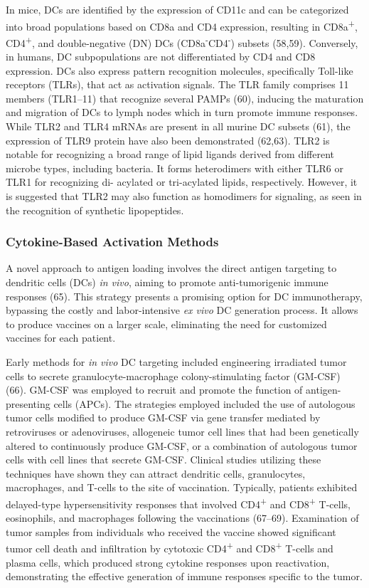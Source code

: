 \documentclass[
]{article}
\begin{document}
In mice, DCs are identified by the expression of CD11c and can be
categorized into broad populations based on CD8a and CD4 expression,
resulting in CD8a\textsuperscript{+}, CD4\textsuperscript{+}, and
double-negative (DN) DCs (CD8a\textsuperscript{-}CD4\textsuperscript{-})
subsets (58,59). Conversely, in humans, DC subpopulations are not
differentiated by CD4 and CD8 expression. DCs also express pattern
recognition molecules, specifically Toll-like receptors (TLRs), that act
as activation signals. The TLR family comprises 11 members (TLR1--11)
that recognize several PAMPs (60), inducing the maturation and migration
of DCs to lymph nodes which in turn promote immune responses. While TLR2
and TLR4 mRNAs are present in all murine DC subsets (61), the expression
of TLR9 protein have also been demonstrated (62,63). TLR2 is notable for
recognizing a broad range of lipid ligands derived from different
microbe types, including bacteria. It forms heterodimers with either
TLR6 or TLR1 for recognizing di- acylated or tri-acylated lipids,
respectively. However, it is suggested that TLR2 may also function as
homodimers for signaling, as seen in the recognition of synthetic
lipopeptides.

\subsubsection{Cytokine-Based Activation
Methods}\label{cytokine-based-activation-methods}

A novel approach to antigen loading involves the direct antigen
targeting to dendritic cells (DCs) \emph{in vivo}, aiming to promote
anti-tumorigenic immune responses (65). This strategy presents a
promising option for DC immunotherapy, bypassing the costly and
labor-intensive \emph{ex vivo} DC generation process. It allows to
produce vaccines on a larger scale, eliminating the need for customized
vaccines for each patient.

Early methods for \emph{in vivo} DC targeting included engineering
irradiated tumor cells to secrete granulocyte-macrophage
colony-stimulating factor (GM-CSF) (66). GM-CSF was employed to recruit
and promote the function of antigen-presenting cells (APCs). The
strategies employed included the use of autologous tumor cells modified
to produce GM-CSF via gene transfer mediated by retroviruses or
adenoviruses, allogeneic tumor cell lines that had been genetically
altered to continuously produce GM-CSF, or a combination of autologous
tumor cells with cell lines that secrete GM-CSF. Clinical studies
utilizing these techniques have shown they can attract dendritic cells,
granulocytes, macrophages, and T-cells to the site of vaccination.
Typically, patients exhibited delayed-type hypersensitivity responses
that involved CD4\textsuperscript{+} and CD8\textsuperscript{+} T-cells,
eosinophils, and macrophages following the vaccinations (67--69).
Examination of tumor samples from individuals who received the vaccine
showed significant tumor cell death and infiltration by cytotoxic
CD4\textsuperscript{+} and CD8\textsuperscript{+} T-cells and plasma
cells, which produced strong cytokine responses upon reactivation,
demonstrating the effective generation of immune responses specific to
the tumor.
\end{document}
